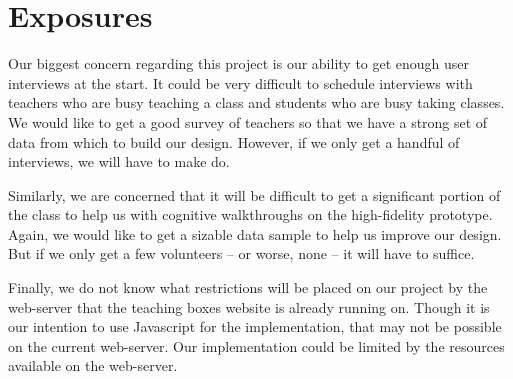 \documentclass[11pt,letter]{article}
\begin{document}
\section{Exposures}
Our biggest concern regarding this project is our ability to get enough user
interviews at the start. It could be very difficult to schedule interviews with
teachers who are busy teaching a class and students who are busy taking classes.
We would like to get a good survey of teachers so that we have a strong set of
data from which to build our design. However, if we only get a handful of
interviews, we will have to make do.

Similarly, we are concerned that it will be difficult to get a significant
portion of the class to help us with cognitive walkthroughs on the high-fidelity
prototype. Again, we would like to get a sizable data sample to help us improve
our design. But if we only get a few volunteers -- or worse, none -- it will
have to suffice.

Finally, we do not know what restrictions will be placed on our project by the
web-server that the teaching boxes website is already running on. Though it is
our intention to use Javascript for the implementation, that may not be possible
on the current web-server. Our implementation could be limited by the resources
available on the web-server.
\end{document}
